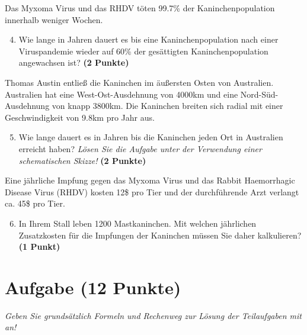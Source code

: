 \documentclass[a4paper, 9pt]{scrartcl}\usepackage[]{graphicx}\usepackage[]{xcolor}
\begin{document}
Das Myxoma Virus und das RHDV töten 99.7\% der Kaninchenpopulation innerhalb weniger Wochen.

\begin{enumerate}
  \setcounter{enumi}{3}  
\item Wie lange in Jahren dauert es bis eine Kaninchenpopulation nach einer Viruspandemie wieder auf 60\% der gesättigten Kaninchenpopulation angewachsen ist?  \textbf{(2 Punkte)}
\end{enumerate}

Thomas Austin entließ die Kaninchen im äußersten Osten von Australien. Australien hat eine West-Ost-Ausdehnung von 4000km und eine Nord-Süd-Ausdehnung von knapp 3800km. Die Kaninchen breiten sich radial mit einer Geschwindigkeit von 9.8km pro Jahr aus.

\begin{enumerate}
  \setcounter{enumi}{4}
\item Wie lange dauert es in Jahren bis die Kaninchen jeden Ort in Australien erreicht haben? \textit{Lösen Sie die Aufgabe unter der Verwendung einer schematischen Skizze!} \textbf{(2 Punkte)}
\end{enumerate}

Eine jährliche Impfung gegen das Myxoma Virus und das Rabbit Haemorrhagic Disease Virus (RHDV) kosten 12\$ pro Tier und der durchführende Arzt verlangt ca. 45\$ pro Tier.

\begin{enumerate}
  \setcounter{enumi}{5}
\item In Ihrem Stall leben 1200 Mastkaninchen. Mit welchen jährlichen Zusatzkosten für die Impfungen der Kaninchen müssen Sie daher kalkulieren? \textbf{(1 Punkt)}
\end{enumerate}
 
\clearpage

\section{Aufgabe \hfill (12 Punkte)}

\textit{Geben Sie grundsätzlich Formeln und Rechenweg zur Lösung der Teilaufgaben mit an!} \\[1Ex]
 
\end{document}
